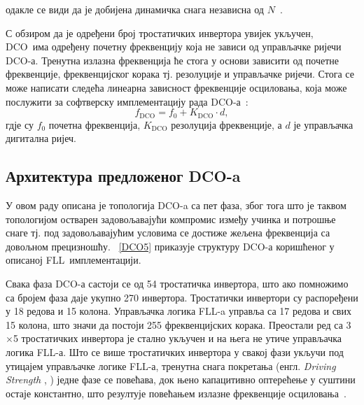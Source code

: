\documentclass[master]{finthesis}
\makeatletter
\newcommand*{\engl}[2][\@empty]{%
    \edef\theacronym{#1}%
    (енгл. \foreignlanguage{english}{\emph{#2}%
    \ifx\theacronym\@empty \else , #1\fi})%
}
\def \FLL  {FLL} %
\def \DCO  {DCO} %
\makeatother
\begin{document}
одакле се види да је добијена динамичка снага независна од $N$~\cite{Razavi:PLL_CMOS_2020}. \par
С обзиром да је одређени број тростатичких инвертора увијек укључен, \DCO\ има одређену почетну фреквенцију која не зависи од управљачке ријечи \DCO-а. Тренутна излазна фреквенција ће стога у основи зависити од почетне фреквенције, фреквенцијског корака тј. резолуције и управљачке ријечи. Стога се може написати следећа линеарна зависност фреквенције осциловања, која може послужити за софтверску имплементацију рада \DCO-а~:  
\begin{equation} \label{f_dco}
	f_\text{DCO} = f_\text{0} + K_\text{DCO} \cdot d,
\end{equation} 
гдје су $f_\text{0}$ почетна фреквенција, $K_\text{DCO}$ резолуција фреквенције, а $d$ је управљачка дигитална ријеч.

\subsection{Архитектура предложеног \DCO-a}
У овом раду описана је топологија \DCO-a са пет фаза, због тога што је таквом топологијом остварен задовољавајући компромис између учинка и потрошње снаге тј. под задовољавајућим условима се достиже жељена фреквенција са довољном прецизношћу. \figurename~\ref{DCO5} приказује структуру \DCO-а коришћеног у описаној \FLL\ имплементацији. \par

Свака фаза \DCO-а састоји се од 54 тростатичка инвертора, што ако помножимо са бројем фаза даје укупно 270 инвертора. Тростатички инвертори су распоређени у 18 редова и 15 колона. Управљачка логика \FLL-a управља са 17 редова и свих 15 колона, што значи да постоји 255 фреквенцијских корака. Преостали ред са 3$\times$5 тростатичких инвертора је стално укључен и на њега не утиче управљачка логика \FLL-а. Што се више тростатичких инвертора у свакој фази укључи под утицајем управљачке логике \FLL-а, тренутна снага покретања \engl{Driving Strength} једне фазе се повећава, док њено капацитивно оптерећење у суштини остаје константно, што резултује повећањем излазне фреквенције осциловања~\cite{Tierno:4443210}.
\end{document}
